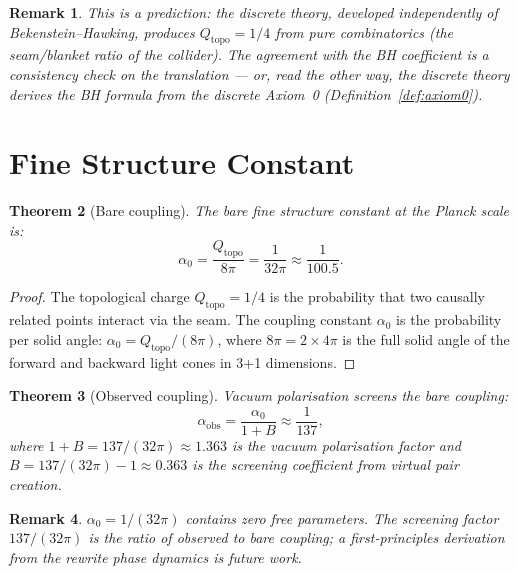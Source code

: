 \documentclass[11pt]{article}
\newtheorem{theorem}{Theorem}[section]
\newtheorem{remark}[theorem]{Remark}
\begin{document}
\begin{remark}
This is a \emph{prediction}: the discrete theory, developed
independently of Bekenstein--Hawking, produces
$Q_{\mathrm{topo}} = 1/4$ from pure combinatorics
(the seam/blanket ratio of the collider).  The agreement
with the BH coefficient is a consistency check on the
translation --- or, read the other way, the discrete theory
\emph{derives} the BH formula from the discrete
Axiom~0 (Definition~\ref{def:axiom0}).
\end{remark}

\section{Fine Structure Constant}
\label{sec:alpha}

\begin{theorem}[Bare coupling]
\label{thm:alpha0}
The bare fine structure constant at the Planck scale is:
\[
  \alpha_0 = \frac{Q_{\mathrm{topo}}}{8\pi}
  = \frac{1}{32\pi} \approx \frac{1}{100.5}.
\]
\end{theorem}

\begin{proof}
The topological charge $Q_{\mathrm{topo}} = 1/4$ is the
probability that two causally related points interact via
the seam.  The coupling constant $\alpha_0$ is the probability
per solid angle: $\alpha_0 = Q_{\mathrm{topo}} / (8\pi)$,
where $8\pi = 2 \times 4\pi$ is the full solid angle of the
forward and backward light cones in 3+1 dimensions.
\end{proof}

\begin{theorem}[Observed coupling]
\label{thm:alpha-obs}
Vacuum polarisation screens the bare coupling:
\[
  \alpha_{\mathrm{obs}} = \frac{\alpha_0}{1 + B}
  \approx \frac{1}{137},
\]
where $1 + B = 137/(32\pi) \approx 1.363$ is the vacuum
polarisation factor and
$B = 137/(32\pi) - 1 \approx 0.363$ is the screening
coefficient from virtual pair creation.
\end{theorem}

\begin{remark}
$\alpha_0 = 1/(32\pi)$ contains zero free parameters.
The screening factor $137/(32\pi)$ is the ratio of observed
to bare coupling; a first-principles derivation from the
rewrite phase dynamics is future work.
\end{remark}
\end{document}
